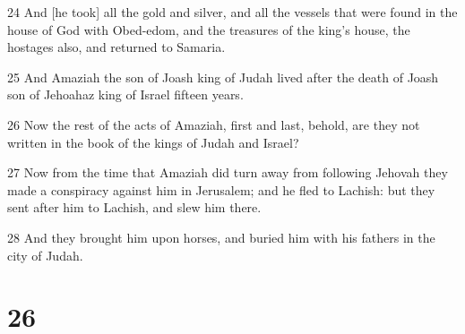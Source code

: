 \par 24 And [he took] all the gold and silver, and all the vessels that were found in the house of God with Obed-edom, and the treasures of the king's house, the hostages also, and returned to Samaria.
\par 25 And Amaziah the son of Joash king of Judah lived after the death of Joash son of Jehoahaz king of Israel fifteen years.
\par 26 Now the rest of the acts of Amaziah, first and last, behold, are they not written in the book of the kings of Judah and Israel?
\par 27 Now from the time that Amaziah did turn away from following Jehovah they made a conspiracy against him in Jerusalem; and he fled to Lachish: but they sent after him to Lachish, and slew him there.
\par 28 And they brought him upon horses, and buried him with his fathers in the city of Judah.

\chapter{26}

